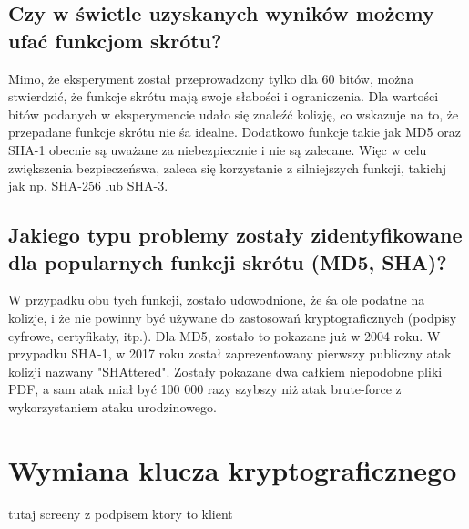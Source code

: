 \documentclass{article}
\begin{document}
\subsection{Czy w świetle uzyskanych wyników możemy ufać funkcjom skrótu?}
Mimo, że eksperyment został przeprowadzony tylko dla 60 bitów, można stwierdzić, że funkcje skrótu mają swoje słabości i ograniczenia. Dla wartości bitów podanych w eksperymencie
udało się znaleźć kolizję, co wskazuje na to, że przepadane funkcje skrótu nie śa idealne. Dodatkowo funkcje takie jak MD5 oraz SHA-1 obecnie są uważane za niebezpiecznie i nie są zalecane.
Więc w celu zwiększenia bezpieczeńswa, zaleca się korzystanie z silniejszych funkcji, takichj jak np. SHA-256 lub SHA-3.
\subsection{Jakiego typu problemy zostały zidentyfikowane dla popularnych funkcji skrótu (MD5, SHA)?}
W przypadku obu tych funkcji, zostało udowodnione, że śa ole podatne na kolizje, i że nie powinny być używane
do zastosowań kryptograficznych (podpisy cyfrowe, certyfikaty, itp.). Dla MD5, zostało to pokazane już w 2004 roku. W przypadku SHA-1, w 2017 roku został
zaprezentowany pierwszy publiczny atak kolizji nazwany "SHAttered". Zostały pokazane dwa całkiem niepodobne pliki PDF, a sam atak miał być 100 000 razy szybszy
niż atak brute-force z wykorzystaniem ataku urodzinowego.

\section{Wymiana klucza kryptograficznego}
tutaj screeny z podpisem ktory to klient
\end{document}
